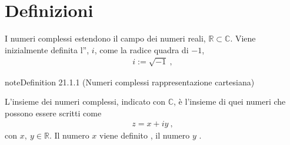 \documentclass[letterpaper,10pt,italian]{jupyterBook}
\begin{document}
\section{Definizioni}
\label{\detokenize{ch/algebra/complex-algebra:definizioni}}\label{\detokenize{ch/algebra/complex-algebra:math-hs-algebra-complex-def}}
\sphinxAtStartPar
I numeri complessi estendono il campo dei numeri reali, \(\mathbb{R} \subset \mathbb{C}\). Viene inizialmente definita l”, \(i\), come la radice quadra di \(-1\),
\begin{equation*}
\begin{split}i := \sqrt{-1} \ ,\end{split}
\end{equation*}
\sphinxAtStartPar
{}  
\label{ch/algebra/complex-algebra:definition-0}
\begin{sphinxadmonition}{note}{Definition 21.1.1 (Numeri complessi \sphinxhyphen{} rappresentazione cartesiana)}



\sphinxAtStartPar
L’insieme dei numeri complessi, indicato con \(\mathbb{C}\), è l’insieme di quei numeri che possono essere scritti come
\begin{equation*}
\begin{split}z = x + i y \ ,\end{split}
\end{equation*}
\sphinxAtStartPar
con \(x, \ y \in \mathbb{R}\). Il numero \(x\) viene definito , il numero \(y\) .
\end{sphinxadmonition}
\end{document}
